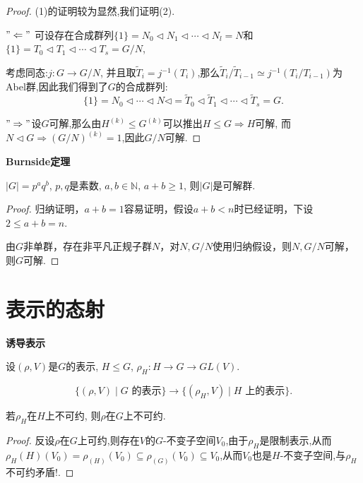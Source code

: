 \begin{proof}
    (1)的证明较为显然,我们证明(2).

    $"\Leftarrow"  $ 可设存在合成群列$\{1\}  = N_0 \triangleleft N_1 \triangleleft \cdots \triangleleft N_l = N$和$\{1\}  = T_0 \triangleleft T_1 \triangleleft \cdots \triangleleft T_s = G/N$,

    考虑同态:$j: G \to G/N$, 并且取$\tilde{T}_i = j^{-1}(T_i)$,那么$\tilde{T}_i/\tilde{T}_{i-1} \simeq j^{-1}(T_i/T_{i-1}) $为Abel群,因此我们得到了$G$的合成群列:
    $$\{1\} = N_0 \triangleleft \cdots \triangleleft N \triangleleft = \tilde{T}_0 \triangleleft \tilde{T}_1 \triangleleft \cdots \triangleleft \tilde{T}_s = G.$$

    $"\Rightarrow"  $设$G$可解,那么由$H^{(k)} \leq G^{(k)}$可以推出$H\leq G \Rightarrow H$可解,
    而$N \triangleleft G \Rightarrow (G/N) ^{(k)} = 1$,因此$G/N$可解.
\end{proof}
\begin{theorem} \textbf{Burnside定理}\par
    \qquad $|G|=p^aq^b$, $p,q$是素数, 
    $a,b\in \mathbb{N}$, $a+b\geq 1$, 则$|G|$是可解群.
\end{theorem}
\begin{proof}
	归纳证明，$a+b=1$容易证明，假设$a+b<n$时已经证明，下设$2\leq a+b=n$.
	
	由$G$非单群，存在非平凡正规子群$N$，对$N,G/N$使用归纳假设，则$N,G/N$可解，则$G$可解.
	
\end{proof}

\section{表示的态射}

\begin{definition} \textbf{诱导表示}\par
    \qquad 设$(\rho,V)$是$G$的表示, $H\leq G$, 
    $\rho_H:H\rightarrow G\rightarrow GL(V)$. 

   $$ \{(\rho,V)\mid G\text{ 的表示}\} \rightarrow 
   \{(\rho_H,V)\mid H\text{ 上的表示}\}.$$
\end{definition}
\begin{proposition}
    若$\rho_H$在$H$上不可约, 则$\rho$在$G$上不可约.
\end{proposition}
\begin{proof}
    反设$\rho$在$G$上可约,则存在$V$的$G$-不变子空间$V_0$,由于$\rho_H$是限制表示,从而$\rho_H(H)(V_0) = \rho_(H) (V_0) \subseteq \rho_(G) (V_0) \subseteq V_0$,从而$V_0$也是$H$-不变子空间,与$\rho_H$不可约矛盾!.
\end{proof}



